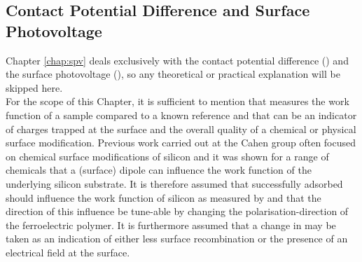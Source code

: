 \subsection{Contact Potential Difference and Surface Photovoltage}
Chapter \ref{chap:spv} deals exclusively with the contact potential difference (\cpd{}) and the surface photovoltage (\spv{}), so any theoretical or practical explanation will be skipped here.\\
For the scope of this Chapter, it is sufficient to mention that \cpd{} measures the work function of a sample compared to a known reference and that \spv{} can be an indicator of charges trapped at the surface and the overall quality of a chemical or physical surface modification. Previous work carried out at the Cahen group often focused on chemical surface modifications of silicon and it was shown for a range of chemicals that a (surface) dipole can influence the work function of the underlying silicon substrate. It is therefore assumed that successfully adsorbed \pvdf{} should influence the work function of silicon as measured by \cpd{} and that the direction of this influence be tune-able by changing the polarisation-direction of the ferroelectric polymer. It is furthermore assumed that a change in \spv{} may be taken as an indication of either less surface recombination or the presence of an electrical field at the surface.


